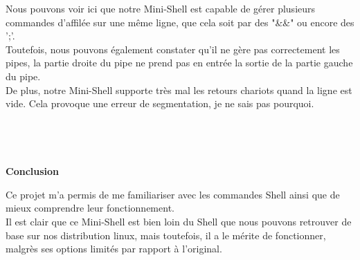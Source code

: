 \documentclass [12pt]{article}
\begin{document}
Nous pouvons voir ici que notre Mini-Shell est capable de gérer plusieurs commandes  d'affilée sur une même ligne, que cela soit par des "\&\&" ou encore des ';'.\\
Toutefois, nous pouvons également constater qu'il ne gère pas correctement les pipes, la partie droite du pipe ne prend pas en entrée la sortie de la partie gauche du pipe.\\
De plus, notre Mini-Shell supporte très mal les retours chariots quand la ligne est vide. Cela provoque une erreur de segmentation, je ne sais pas pourquoi.
\textbf {\\\\\\\\\\\Large Conclusion\\}

Ce projet m'a permis de me familiariser avec les commandes Shell ainsi que de mieux comprendre leur fonctionnement. \\Il est clair que ce Mini-Shell est bien loin du Shell que nous pouvons retrouver de base sur nos distribution linux, mais toutefois, il a le mérite de fonctionner, malgrès ses options limités par rapport à l'original.
\end{document}
